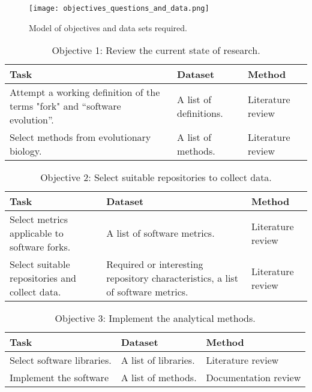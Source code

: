 \begin{figure}[H]
  \texttt{[image: objectives\_questions\_and\_data.png]}
  \caption{Model of objectives and data sets required.}
  \label{fig:objectives}
\end{figure}

\begin{table}[H]
\caption*{Objective 1: Review the current state of research.}
\label{table:objective1} 
\centering
\begin{tabu} to 
\toprule
Task & Dataset & Method \\
\midrule
Attempt a working definition of the terms "fork" and “software evolution”. & A list of definitions. & Literature review \\
\midrule
Select methods from evolutionary biology. & A list of methods. & Literature review \\
\bottomrule
\end{tabu}
\end{table}

\begin{table}[H]
\caption*{Objective 2: Select suitable repositories to collect data.}
\label{table:objective2}
\centering
\begin{tabu} to 
\toprule
Task & Dataset & Method \\
\midrule
Select metrics applicable to software forks. & A list of software metrics. & Literature review \\
\midrule
Select suitable repositories and collect data. & Required or interesting repository characteristics, a list of software metrics. & Literature review \\
\bottomrule
\end{tabu}
\end{table}

\begin{table}[H]
\caption*{Objective 3: Implement the analytical methods.}
\label{table:objective3}
\centering
\begin{tabu} to 
\toprule
Task & Dataset & Method \\
\midrule
Select software libraries. & A list of libraries. & Literature review \\
\midrule
Implement the software & A list of methods. & Documentation review \\
\bottomrule
\end{tabu}
\end{table}


